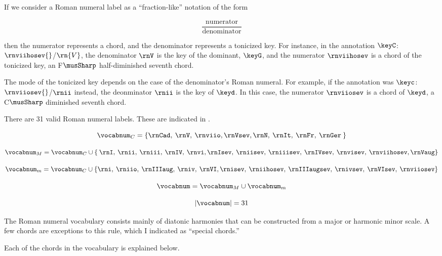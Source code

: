 
If we consider a Roman numeral label as a ``fraction-like''
notation of the form 

\begin{equation}
    \frac{\text{numerator}}{\text{denominator}}
\end{equation}

then the numerator represents a chord, and the denominator
represents a tonicized key. For instance, in the annotation
$\keyC$:$\rnviihosev{}$/$\rn{V}$, the denominator $\rnV$ is
the key of the dominant, $\keyG$, and the numerator
$\rnviihosev$ is a chord of the tonicized key, an
F$\musSharp$ half-diminished seventh chord.

The mode of the tonicized key depends on the case of the
denominator's Roman numeral. For example, if the annotation
was $\keyc$:$\rnviiosev{}$/$\rnii$ instead, the deonminator
$\rnii$ is the key of $\keyd$. In this case, the numerator
$\rnviiosev$ is a chord of $\keyd$, a C$\musSharp$
diminished seventh chord.

There are 31 valid Roman numeral labels. These are indicated
in .



\begin{equation}
    \vocabnum_{C} = \{ \rnCad, \: \rnV, \: \rnviio,
    \rnVsev, \rnN, \: \rnIt, \: \rnFr, \: \rnGer \: \}
\end{equation}

\begin{equation}
    \vocabnum_{M} = \vocabnum_{C} \cup \{ \: \rnI, \: \rnii, \: 
    \rniii, \: \rnIV, \: \rnvi, \rnIsev, \: \rniisev, \: 
    \rniiisev, \: \rnIVsev, \: \rnvisev, \: \rnviihosev, \rnVaug \}
\end{equation}

\begin{equation}
    \vocabnum_{m} = \vocabnum_{C} \cup  \{ \rni, \: \rniio, \: 
    \rnIIIaug, \: \rniv, \: \rnVI, \rnisev, \: \rniihosev, \: 
    \rnIIIaugsev, \: \rnivsev, \: \rnVIsev, \: \rnviiosev \}
\end{equation}

\begin{equation}
    \vocabnum = \vocabnum_{M} \cup \vocabnum_{m}
\end{equation}

\begin{equation}
    | \vocabnum | = 31
\end{equation}

                

The Roman numeral vocabulary consists mainly of diatonic
harmonies that can be constructed from a major or harmonic
minor scale. A few chords are exceptions to this rule, \:
which I indicated as ``special chords.''

Each of the chords in the vocabulary is explained below.


